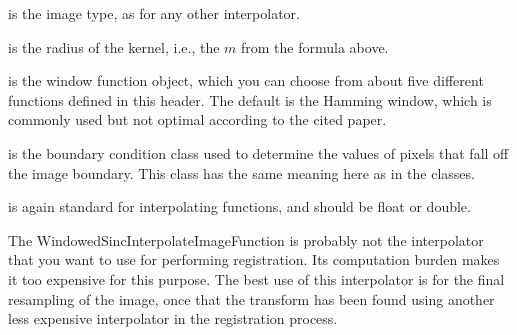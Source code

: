 
 is the image type, as for any other interpolator. 

 is the radius of the kernel, i.e., the $m$ from the
formula above. 

 is the window function object, which you can choose from
about five different functions defined in this header. The default is the
Hamming window, which is commonly used but not optimal according to the cited
paper. 

 is the boundary condition class used to determine the
values of pixels that fall off the image boundary. This class has the same
meaning here as in the  classes. 

 is again standard for interpolating functions, and should be
float or double.


The WindowedSincInterpolateImageFunction is probably not the interpolator that
you want to use for performing registration. Its computation burden makes it
too expensive for this purpose. The best use of this interpolator is for the
final resampling of the image, once that the transform has been found using
another less expensive interpolator in the registration process.



